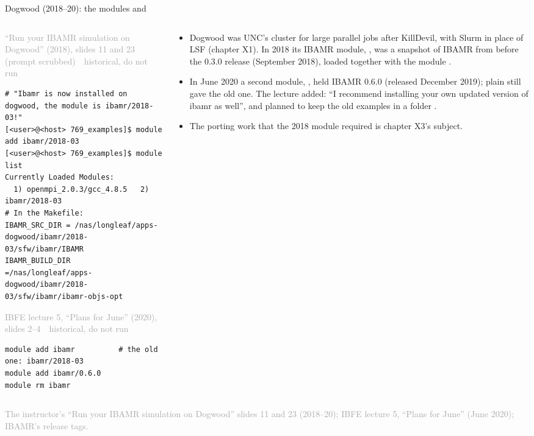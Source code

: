\documentclass[aspectratio=169,11pt]{beamer}
\newcommand{\sourcecredit}[1]{\vfill\begin{flushright}\tiny\textcolor{DarkGray}{#1}\end{flushright}}
\newcommand{\hist}[1]{{\tiny\sffamily\textcolor{DarkGray}{#1\ \textbullet\ historical, do not run}}\par\nointerlineskip\vspace{0.3mm}}
\begin{document}
\begin{frame}[fragile]{Dogwood (2018--20): the modules  and }
\label{fr:dogwood}
\begin{columns}[T,onlytextwidth]
\begin{column}{0.5\textwidth}
\hist{``Run your IBAMR simulation on Dogwood'' (2018), slides 11 and 23 (prompt scrubbed)}
\begin{lstlisting}[style=hist]
# "Ibamr is now installed on dogwood, the module is ibamr/2018-03!"
[<user>@<host> 769_examples]$ module add ibamr/2018-03
[<user>@<host> 769_examples]$ module list
Currently Loaded Modules:
  1) openmpi_2.0.3/gcc_4.8.5   2) ibamr/2018-03
# In the Makefile:
IBAMR_SRC_DIR = /nas/longleaf/apps-dogwood/ibamr/2018-03/sfw/ibamr/IBAMR
IBAMR_BUILD_DIR  =/nas/longleaf/apps-dogwood/ibamr/2018-03/sfw/ibamr/ibamr-objs-opt
\end{lstlisting}
\hist{IBFE lecture 5, ``Plans for June'' (2020), slides 2--4}
\begin{lstlisting}[style=hist]
module add ibamr          # the old one: ibamr/2018-03
module add ibamr/0.6.0
module rm ibamr
\end{lstlisting}
\end{column}
\begin{column}{0.47\textwidth}
\footnotesize
\begin{itemize}\setlength{\itemsep}{2pt}
  \item Dogwood was UNC's cluster for large parallel jobs after KillDevil, with Slurm in place of LSF (chapter X1). In 2018 its IBAMR module, , was a snapshot of IBAMR from before the 0.3.0 release (September 2018), loaded together with the module .
  \item In June 2020 a second module, , held IBAMR 0.6.0 (released December 2019); plain  still gave the old one. The lecture added: ``I recommend installing your own updated version of ibamr as well'', and planned to keep the old examples in a folder .
  \item The porting work that the 2018 module required is chapter X3's subject.
\end{itemize}
\end{column}
\end{columns}
\sourcecredit{The instructor's ``Run your IBAMR simulation on Dogwood'' slides 11 and 23 (2018--20); IBFE lecture 5, ``Plans for June'' (June 2020); IBAMR's release tags.}
\end{frame}
\end{document}
